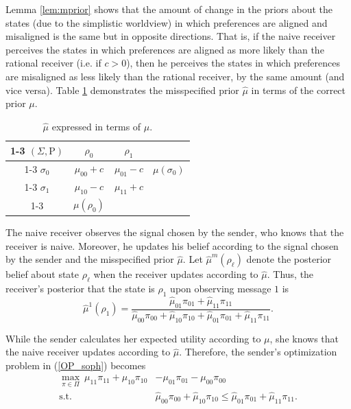 \documentclass[12pt,english]{article}
\newcommand{\Rho}{\mathrm{P}}
\theoremstyle{plain}
\begin{document}
\noindent Lemma \ref{lem:mprior} shows that the amount of change in the priors about the states (due to the simplistic worldview) in which preferences are aligned and misaligned is the same but in opposite directions. 
That is, if the naive receiver perceives the states in which preferences are aligned as more likely than the rational receiver (i.e. if $c>0$), then he perceives the states in which preferences are misaligned as less likely than the rational receiver, by the same amount (and vice versa). 
Table \ref{tab:mpriordiff} demonstrates the misspecified prior $\hat\mu$ in terms of the correct prior $\mu$.  
\begin{table}[H]
\begin{centering}
\begin{tabular}{|c|c|c|c}
\cline{1-3} \cline{2-3} \cline{3-3} 
$(\Sigma,\Rho)$ & $\rho_0$ & $\rho_1$ & \tabularnewline
\cline{1-3} \cline{2-3} \cline{3-3} 
$\sigma_0$ & $\mu_{00}+c$ & $\mu_{01}-c$ & $\mu(\sigma_0)$\tabularnewline
\cline{1-3} \cline{2-3} \cline{3-3} 
$\sigma_1$ & $\mu_{10}-c$ & $\mu_{11}+c$ & \tabularnewline
\cline{1-3} \cline{2-3} \cline{3-3} 
\multicolumn{1}{c}{} & \multicolumn{1}{c}{$\mu(\rho_0)$} & \multicolumn{1}{c}{} & \tabularnewline
\end{tabular}
\par\end{centering}
\caption{$\hat\mu$ expressed in terms of $\mu$.}
\label{tab:mpriordiff}
\end{table}

The naive receiver observes the signal chosen by the sender, who knows that the receiver is naive. 
Moreover, he updates his belief according to the signal chosen by the sender and the misspecified prior $\hat\mu$. 
Let $\hat\mu^m(\rho_\ell)$ denote the posterior belief about state $\rho_\ell$ when the receiver updates according to $\hat\mu$. 
Thus, the receiver's posterior that the state is $\rho_1$ upon observing message $1$ is 
\begin{equation}
\hat\mu^{1}(\rho_1)=\frac{\hat\mu_{01}\pi_{01}+\hat\mu_{11}\pi_{11}}{\hat\mu_{00}\pi_{00}+\hat\mu_{10}\pi_{10}+\hat\mu_{01}\pi_{01}+\hat\mu_{11}\pi_{11}}.\label{upating_BR}
\end{equation}

\noindent While the sender calculates her expected utility according to $\mu$, she knows that the naive receiver updates according to $\hat\mu$. 
Therefore, the sender's optimization problem in (\ref{OP_soph}) becomes 
\begin{align}
\max_{\pi\in\Pi}\: \mu_{11}\pi_{11}+\mu_{10}\pi_{10}&-\mu_{01}\pi_{01}-\mu_{00}\pi_{00}\nonumber\\
\text{s.t. } &\hat\mu_{00}\pi_{00}+\hat\mu_{10}\pi_{10}\leq \hat\mu_{01}\pi_{01}+\hat\mu_{11}\pi_{11}.\label{OP_naive}
\end{align}
\end{document}
